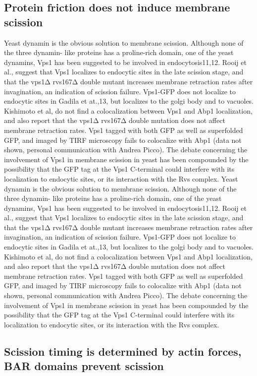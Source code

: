 	\subsection{Protein friction does not induce membrane scission }
		Yeast dynamin is the obvious solution to membrane scission. Although none of the three dynamin- like proteins has a proline-rich domain, one of the yeast dynamins, Vps1 has been suggested to be involved in endocytosis11,12. Rooij et al., suggest that Vps1 localizes to endocytic sites in the late scission stage, and that the vps1Δ rvs167Δ double mutant increases membrane retraction rates after invagination, an indication of scission failure. Vps1-GFP does not localize to endocytic sites in Gadila et at.,13, but localizes to the golgi body and to vacuoles. Kishimoto et al, do not find a colocalization between Vps1 and Abp1 localization, and also report that the vps1Δ rvs167Δ  double mutation does not affect membrane retraction rates. Vps1 tagged with both GFP as well as superfolded GFP, and imaged by TIRF microscopy fails to colocalize with Abp1 (data not shown, personal communication with Andrea Picco). The debate concerning the involvement of Vps1 in membrane scission in yeast has been compounded by the possibility that the GFP tag at the Vps1 C-terminal could interfere with its localization to endocytic sites, or its interaction with the Rvs complex. 
			Yeast dynamin is the obvious solution to membrane scission. Although none of the three dynamin- like proteins has a proline-rich domain, one of the yeast dynamins, Vps1 has been suggested to be involved in endocytosis11,12. Rooij et al., suggest that Vps1 localizes to endocytic sites in the late scission stage, and that the vps1Δ rvs167Δ double mutant increases membrane retraction rates after invagination, an indication of scission failure. Vps1-GFP does not localize to endocytic sites in Gadila et at.,13, but localizes to the golgi body and to vacuoles. Kishimoto et al, do not find a colocalization between Vps1 and Abp1 localization, and also report that the vps1Δ rvs167Δ  double mutation does not affect membrane retraction rates. Vps1 tagged with both GFP as well as superfolded GFP, and imaged by TIRF microscopy fails to colocalize with Abp1 (data not shown, personal communication with Andrea Picco). The debate concerning the involvement of Vps1 in membrane scission in yeast has been compounded by the possibility that the GFP tag at the Vps1 C-terminal could interfere with its localization to endocytic sites, or its interaction with the Rvs complex. 
	
	\subsection{Scission timing is determined by actin forces, \\
		BAR domains prevent scission}